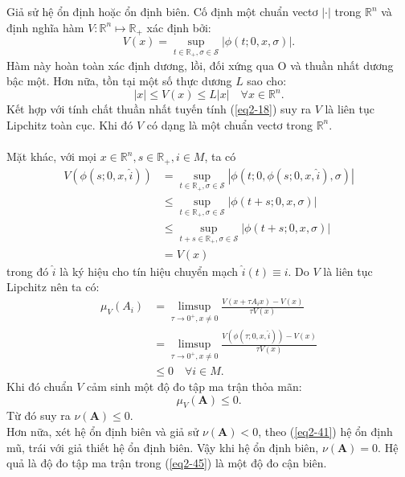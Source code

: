 \documentclass[14pt,a4paper,oneside]{report}		%
\theoremstyle{definition}
\begin{document}
Giả sử hệ ổn định hoặc ổn định biên. Cố định một chuẩn vectơ $|\cdot|$ trong $\mathbb{R}^n$ và định nghĩa hàm $V:\mathbb{R}^n\mapsto\mathbb{R}_+$ xác định bởi:
\begin{equation} \label{eq2-44}
V(x)=\sup_{t\in\mathbb{R}_+,\sigma\in\mathcal{S}}|\phi(t;0,x,\sigma)|.
\end{equation}
Hàm này hoàn toàn xác định dương, lồi, đối xứng qua O và thuần nhất dương bậc một. Hơn nữa, tồn tại một số thực dương $L$ sao cho:
$$|x|\leq V(x)\leq L|x|\quad\forall x\in\mathbb{R}^n.$$
Kết hợp với tính chất thuần nhất tuyến tính (\ref{eq2-18}) suy ra $V$ là liên tục Lipchitz toàn cục. Khi đó $V$ có dạng là một chuẩn vectơ trong $\mathbb{R}^n$.\\\\
Mặt khác, với mọi $x\in\mathbb{R}^n, s\in\mathbb{R}_+,i\in M$, ta có
\begin{equation}
\begin{split}
V(\phi(s;0,x,\widehat{i})) & =\sup_{t\in\mathbb{R}_+,\sigma\in\mathcal{S}}|\phi(t;0,\phi(s;0,x,\widehat{i}),\sigma)|\\
& \leq \sup_{t\in\mathbb{R}_+,\sigma\in\mathcal{S}}|\phi(t+s;0,x,\sigma)|\\
& \leq \sup_{t+s\in\mathbb{R}_+,\sigma\in\mathcal{S}}|\phi(t+s;0,x,\sigma)|\\
& = V(x)
\end{split}
\end{equation}
trong đó $\widehat{i}$ là ký hiệu cho tín hiệu chuyển mạch $\widehat{i}(t)\equiv i$. Do $V$ là liên tục Lipchitz nên ta có:
\begin{equation}
\begin{split}
\mu_V(A_i) & = \limsup_{\tau\rightarrow 0^+,x\neq 0}\frac{V(x+\tau A_ix)-V(x)}{\tau V(x)}\\
& = \limsup_{\tau\rightarrow 0^+,x\neq 0}\frac{V(\phi(\tau;0,x,\widehat{i}))-V(x)}{\tau V(x)}\\
& \leq 0 \quad \forall i\in M.
\end{split}
\end{equation}
Khi đó chuẩn $V$ cảm sinh một độ đo tập ma trận thỏa mãn:
\begin{equation} \label{eq2-45}
\mu_V(\mathbf{A})\leq 0.
\end{equation}
Từ đó suy ra $\nu(\mathbf{A})\leq 0$.\\

Hơn nữa, xét hệ ổn định biên và giả sử $\nu(\mathbf{A})<0$, theo (\ref{eq2-41}) hệ ổn định mũ, trái với giả thiết hệ ổn định biên. Vậy khi hệ ổn định biên, $\nu(\mathbf{A})=0$. Hệ quả là độ đo tập ma trận trong (\ref{eq2-45}) là một độ đo cận biên.\\
\end{document}
